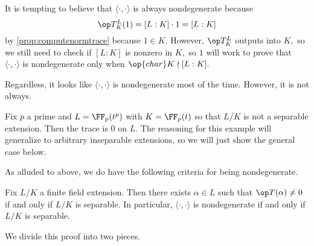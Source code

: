 It is tempting to believe that $\langle\cdot,\cdot\rangle$ is always nondegenerate because
\[\op T^L_K(1)=[L:K]\cdot1=[L:K]\]
by \autoref{prop:computenormtrace} because $1\in K.$ However, $\op T^L_K$ outputs into $K,$ so we still need to check if $[L:K]$ is nonzero in $K,$ so $1$ will work to prove that $\langle\cdot,\cdot\rangle$ is nondegenerate only when $\op{char}K\nmid[L:K].$

Regardless, it looks like $\langle\cdot,\cdot\rangle$ is nondegenerate most of the time. However, it is not always.
\begin{ex}
	Fix $p$ a prime and $L=\FF_p(t^p)$ with $K=\FF_p(t)$ so that $L/K$ is not a separable extension. Then the trace is $0$ on $L.$ The reasoning for this example will generalize to arbitrary inseparable extensions, so we will just show the general case below.
\end{ex}
As alluded to above, we do have the following criteria for being nondegenerate.
\begin{theorem} \label{thm:nondegtrace}
	Fix $L/K$ a finite field extension. Then there exists $\alpha\in L$ such that $\op T(\alpha)\ne0$ if and only if $L/K$ is separable. In particular, $\langle\cdot,\cdot\rangle$ is nondegenerate if and only if $L/K$ is separable.
\end{theorem}
We divide this proof into two pieces.
